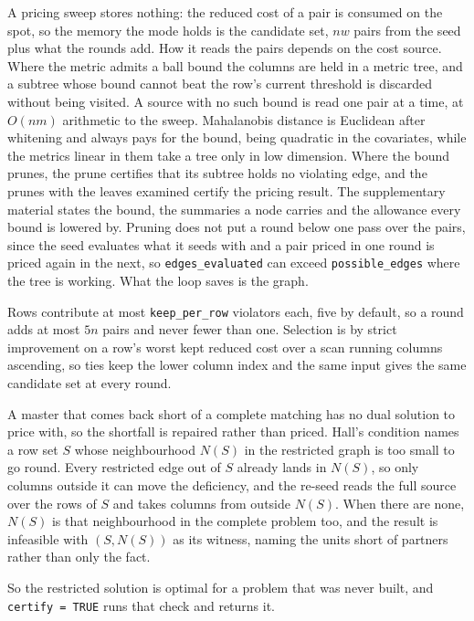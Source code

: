 A pricing sweep stores nothing: the reduced cost of a pair is consumed on the
spot, so the memory the mode holds is the candidate set, \(nw\) pairs from the
seed plus what the rounds add. How it reads the pairs depends on the cost
source. Where the metric admits a ball bound the columns are held in a metric
tree, and a subtree whose bound cannot beat the row's current threshold is
discarded without being visited. A source with no such bound is read one pair
at a time, at \(O(nm)\) arithmetic to the sweep. Mahalanobis distance is
Euclidean after whitening and always pays for the bound, being quadratic in the
covariates, while the metrics linear in them take a tree only in low dimension.
Where the bound prunes, the prune certifies that its subtree holds no violating
edge, and the prunes with the leaves examined certify the pricing result. The
supplementary material states the bound, the summaries a node carries and the
allowance every bound is lowered by. Pruning does not put a round below one
pass over the pairs, since the seed evaluates what it seeds with and a pair
priced in one round is priced again in the next, so \texttt{edges\_evaluated} can
exceed \texttt{possible\_edges} where the tree is working. What the loop saves is the graph.

Rows contribute at most \texttt{keep\_per\_row} violators each, five by default, so a
round adds at most \(5n\) pairs and never fewer than one. Selection is by strict
improvement on a row's worst kept reduced cost over a scan running columns
ascending, so ties keep the lower column index and the same input gives the
same candidate set at every round.

A master that comes back short of a complete matching has no dual solution to
price with, so the shortfall is repaired rather than priced. Hall's condition
\citep{Hall1935} names a row set \(S\) whose neighbourhood \(N(S)\) in the restricted
graph is too small to go round. Every restricted edge out of \(S\) already lands
in \(N(S)\), so only columns outside it can move the deficiency, and the re-seed
reads the full source over the rows of \(S\) and takes columns from outside
\(N(S)\). When there are none, \(N(S)\) is that neighbourhood in the complete problem too,
and the result is infeasible with \((S, N(S))\) as its witness, naming the units
short of partners rather than only the fact.

So the restricted solution is optimal for a problem that was never built, and
\texttt{certify\ =\ TRUE} runs that check and returns it.

